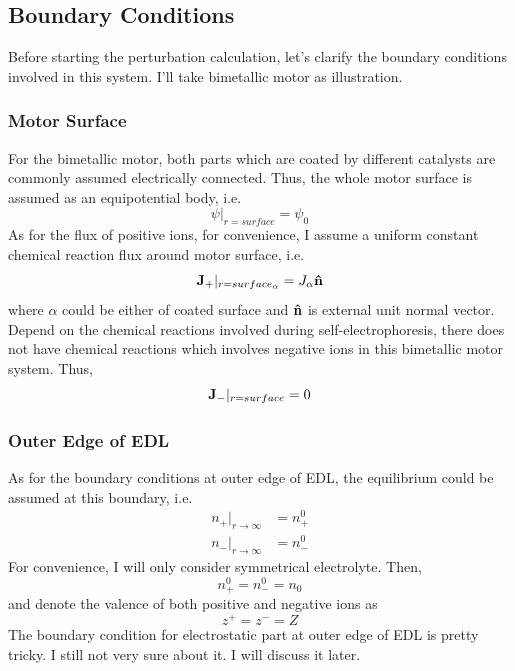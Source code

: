 \documentclass[fontsize=11pt, %
                             paper=a4, %
                             twoside, %
                             captions=tableheading,
                             index=totoc,
                             hyperref]{labbook}
\begin{document}
\begin{addmargin}[4cm]{0cm}
\subsection{Boundary Conditions}
Before starting the perturbation calculation, let's clarify the boundary conditions involved in this system. I'll take bimetallic motor as illustration.
\subsubsection{Motor Surface}
For the bimetallic motor, both parts which are coated by different catalysts are commonly assumed electrically connected. Thus, the whole motor surface is assumed as an equipotential body, i.e.
\begin{equation}
\psi|_{r=surface}=\psi_0
\end{equation}
As for the flux of positive ions, for convenience, I assume a uniform constant chemical reaction flux around motor surface, i.e.
\begin{equation}
\mathbf{J}_+|_{r=surface_\alpha}=J_\alpha \mathbf{\hat{n}}
\end{equation}
where $\alpha$ could be either of coated surface and $\mathbf{\hat{n}}$ is external unit normal vector.\\
Depend on the chemical reactions involved during self-electrophoresis, there does not have chemical reactions which involves negative ions in this bimetallic motor system. Thus,
\begin{equation}
\mathbf{J}_-|_{r=surface}=0
\end{equation}
\subsubsection{Outer Edge of EDL}
As for the boundary conditions at outer edge of EDL, the equilibrium could be assumed at this boundary, i.e.
\begin{equation}
\begin{aligned}
n_+|_{r\to\infty}&=n_+^0\\
n_-|_{r\to\infty}&=n_-^0
\end{aligned}
\end{equation}
For convenience, I will only consider symmetrical electrolyte. Then, 
\begin{equation}
n_+^0=n_-^0=n_0
\end{equation}
and denote the valence of both positive and negative ions as
\begin{equation}
z^+=z^-=Z
\end{equation}
The boundary condition for electrostatic part at outer edge of EDL is pretty tricky. I still not very sure about it. I will discuss it later.

\end{addmargin}
\end{document}
